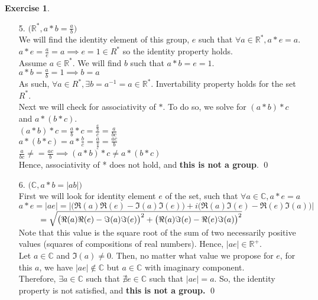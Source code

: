 \documentclass[12pt]{article}
\providecommand{\abs}[1]{\lvert #1 \rvert}
\theoremstyle{definition}
\newtheorem{exercise}[theorem]{Exercise}
\newcommand{\R}{\mathbb R}
\newcommand{\V}{\vspace{0.3cm}\\}
\begin{document}
\begin{exercise}
\begin{enumerate}
\item[5.] $\big(\R^*, a * b = \displaystyle \frac{a}{b} \big)$ \V
We will find the identity element of this group, $e$ such that $\forall a \in \R^*, a*e=a$. \\
$a * e = \frac{a}{e} = a \implies e = 1 \in R^*$ so the identity property holds. \V
Assume $a \in \R^*$. We will find $b$ such that $a * b = e = 1$. \\
$a*b=\frac{a}{b} = 1 \implies b = a$\\
As such, $\forall a \in R^*, \exists b = a^{-1} = a \in \R^*$. Invertability property holds for the set $R^*$. \V
Next we will check for associativity of $*$. To do so, we solve for $(a*b)*c$ and $a*(b*c)$. \V
$(a*b)*c = \displaystyle \frac{a}{b} * c = \frac{\frac{a}{b}}{c} = \frac{a}{bc}$ \V
$a*(b*c) = \displaystyle a* \frac{b}{c} = \frac{a}{\frac{b}{c}} = \frac{ac}{b}$\V
$\frac{a}{bc} \neq = \frac{ac}{b} \implies (a*b)*c \neq a*(b*c)$ \V
Hence, associativity of * does not hold, and \textbf{this is not a group}.  \qed \newpage
\item[6.] $\big(\mathbb{C}, a * b = \abs{ab}\big)$\V
First we will look for identity element $e$ of the set, such that $\forall a \in \mathbb{C}, a*e=a$\\
$a*e = \abs{ae} = \abs{\big(\Re(a)\Re(e) - \Im(a)\Im(e)\big)+i\big(\Re(a)\Im(e) - \Re(e)\Im(a)\big)}$\V
$\hspace*{0.9cm} = \sqrt{\big(\Re(a)\Re(e) - \Im(a)\Im(e)\big)^2 + \big(\Re(a)\Im(e) - \Re(e)\Im(a)\big)^2}$ \V
Note that this value is the square root of the sum of two necessarily positive values (squares of compositions of real numbers). Hence, $\abs{ae} \in \R^+$. \V
Let $a \in \mathbb{C}$ and $\Im(a) \neq 0$. Then, no matter what value we propose for $e$, for this $a$, we have $\abs{ae} \not \in \mathbb{C}$ but $a \in \mathbb{C}$ with imaginary component. \V
Therefore, $\exists a\in \mathbb{C}$ such that $\nexists e \in \mathbb{C}$ such that $\abs{ae} = a$. So, the identity property is not satisfied, and \textbf{this is not a group.} \qed
\end{enumerate}

\end{exercise}
\end{document}
